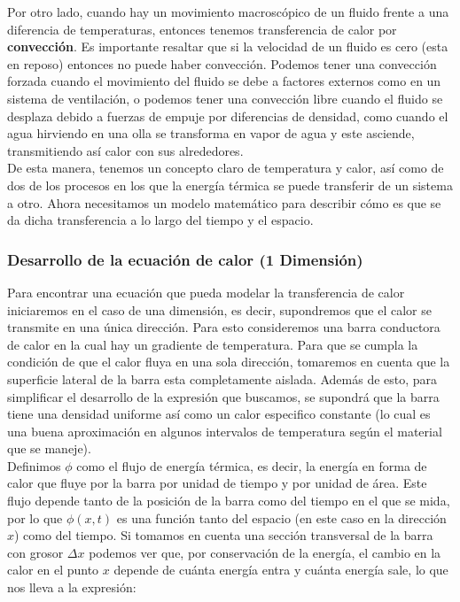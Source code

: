 \documentclass[12pt]{article}
\begin{document}
Por otro lado, cuando hay un movimiento macroscópico de un fluido frente a una diferencia de temperaturas, entonces tenemos transferencia de calor por \textbf{convección}. Es importante resaltar que si la velocidad de un fluido es cero (esta en reposo) entonces no puede haber convección. Podemos tener una convección forzada cuando el movimiento del fluido se debe a factores externos como en un sistema de ventilación, o podemos tener una convección libre cuando el fluido se desplaza debido a fuerzas de empuje por diferencias de densidad, como cuando el agua hirviendo en una olla se transforma en vapor de agua y este asciende, transmitiendo así calor con sus alrededores. \\

De esta manera, tenemos un concepto claro de temperatura y calor, así como de dos de los procesos en los que la energía térmica se puede transferir de un sistema a otro. Ahora necesitamos un modelo matemático para describir cómo es que se da dicha transferencia a lo largo del tiempo y el espacio. \\

\subsubsection{Desarrollo de la ecuación de calor (1 Dimensión)}

Para encontrar una ecuación que pueda modelar la transferencia de calor iniciaremos en el caso de una dimensión, es decir, supondremos que el calor se transmite en una única dirección. Para esto consideremos una barra conductora de calor en la cual hay un gradiente de temperatura. Para que se cumpla la condición de que el calor fluya en una sola dirección, tomaremos en cuenta que la superficie lateral de la barra esta completamente aislada. Además de esto, para simplificar el desarrollo de la expresión que buscamos, se supondrá que la barra tiene una densidad uniforme así como un calor especifico constante (lo cual es una buena aproximación en algunos intervalos de temperatura según el material que se maneje). \\

Definimos $\phi$ como el flujo de energía térmica, es decir, la energía en forma de calor que fluye por la barra por unidad de tiempo y por unidad de área. Este flujo depende tanto de la posición de la barra como del tiempo en el que se mida, por lo que $\phi(x,t)$ es una función tanto del espacio (en este caso en la dirección $x$) como del tiempo. Si tomamos en cuenta una sección transversal de la barra con grosor $\Delta x$ podemos ver que, por conservación de la energía, el cambio en la calor en el punto $x$ depende de cuánta energía entra y cuánta energía sale, lo que nos lleva a la expresión:
\end{document}

